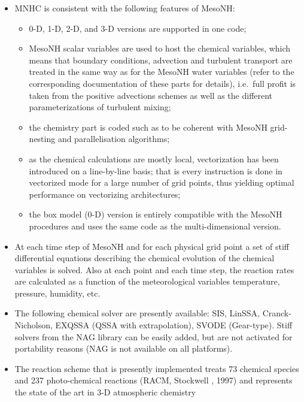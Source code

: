 \begin{itemize}
\item MNHC is consistent with the following features of MesoNH:
  \begin{itemize}
    \item 0-D, 1-D, 2-D, and 3-D versions are supported in one code;
    \item MesoNH scalar variables are used to host the chemical variables,
          which means that boundary conditions, advection and
          turbulent transport are treated in the same way as for the
          MesoNH water variables (refer to the corresponding documentation
          of these parts for details),
          i.e.~full profit is taken from the positive advections schemes
          as well as the different parameterizations of turbulent mixing;
    \item the chemistry part is coded such as to be coherent
          with MesoNH grid-nesting and parallelisation algorithms;
    \item as the chemical calculations are mostly local, vectorization
          has been introduced on a line-by-line basis; that is
          every instruction is done in vectorized mode for a large
          number of grid points, thus yielding optimal performance
          on vectorizing architectures;
    \item the box model (0-D) version is entirely compatible
          with the MesoNH procedures
          and uses the same code as the multi-dimensional version.
  \end{itemize}
\item At each time step of MesoNH and for each physical grid point
      a set of stiff differential equations describing the chemical 
      evolution of the chemical variables is solved.
      Also at each point and each time step, the reaction
      rates are calculated as a function of the meteorological variables
      temperature, pressure, humidity, etc.
\item The following chemical solver are presently available:
      SIS, LinSSA, Cranck-Nicholson, EXQSSA (QSSA with extrapolation),
      SVODE (Gear-type). Stiff solvers from the NAG library can be easily
      added, but are not activated for portability reasons (NAG is
      not available on all platforms).
\item The reaction scheme 
      that is presently implemented treats 73 chemical
      species and 237 photo-chemical reactions (RACM, Stockwell {\etal}, 1997)
      and represents the state of the art in 3-D atmospheric chemistry

\end{itemize}
